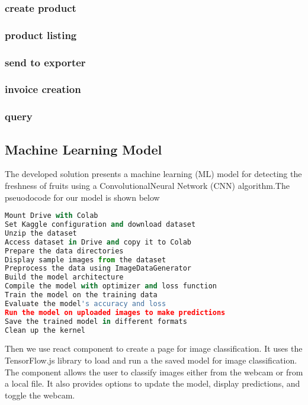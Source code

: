 \subsubsection{create product}

\subsubsection{product listing}

\subsubsection{send to exporter}

\subsubsection{invoice creation}

\subsubsection{query}

\subsection{Machine Learning Model}
\noindent The developed solution presents a machine learning (ML) model for detecting the freshness of fruits using a ConvolutionalNeural Network (CNN) algorithm.The pseuodocode for our model is shown below \par
\begin{lstlisting}[language=Python , caption=ML model]
Mount Drive with Colab
Set Kaggle configuration and download dataset
Unzip the dataset
Access dataset in Drive and copy it to Colab
Prepare the data directories
Display sample images from the dataset
Preprocess the data using ImageDataGenerator
Build the model architecture
Compile the model with optimizer and loss function
Train the model on the training data
Evaluate the model's accuracy and loss
Run the model on uploaded images to make predictions
Save the trained model in different formats
Clean up the kernel
\end{lstlisting}
\noindent Then we use react component to create a page for image classification. It uses the TensorFlow.js library to load and run a the saved model for image classification. The component allows the user to classify images either from the webcam or from a local file. It also provides options to update the model, display predictions, and toggle the webcam.
\noindent 








